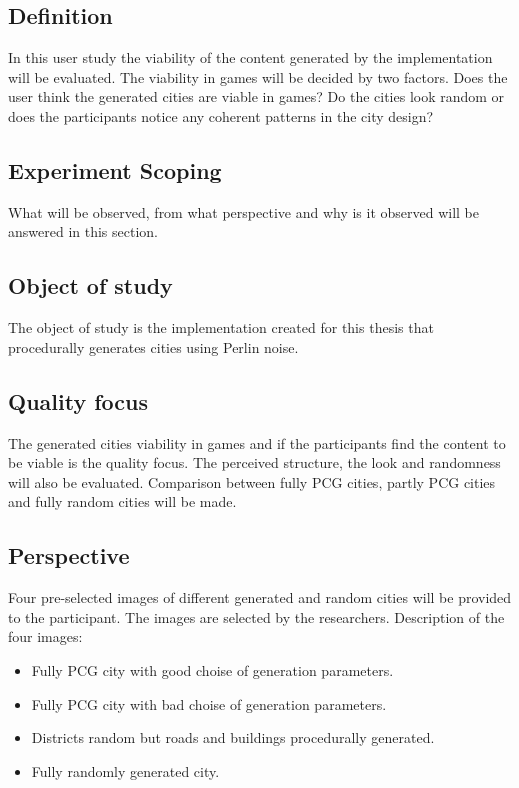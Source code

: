 	\subsection*{Definition}
	In this user study the viability of the content generated by the implementation will be evaluated.  The viability in games will be decided by two factors. Does the user think the generated cities are viable in games? Do the cities look random or does the participants notice any coherent patterns in the city design?
			
		
	\subsection{Experiment Scoping}
	What will be observed, from what perspective and why is it observed will be answered in this section.
		
	\subsection*{Object of study}
	The object of study is the implementation created for this thesis that procedurally generates cities using Perlin noise.
			
	\subsection*{Quality focus}
	The generated cities viability in games and if the participants find the content to be viable is the quality focus. The perceived structure, the look and randomness will also be evaluated. Comparison between fully PCG cities, partly PCG cities and fully random cities will be made.
			
	\subsection*{Perspective}
	Four pre-selected images of different generated and random cities will be provided to the participant. The images are selected by the researchers. Description of the four images:
	\begin{itemize}
		\item Fully PCG city with good choise of generation parameters.
		\item Fully PCG city with bad choise of generation parameters.
		\item Districts random but roads and buildings procedurally generated.
		\item Fully randomly generated city.
	\end{itemize}
			
